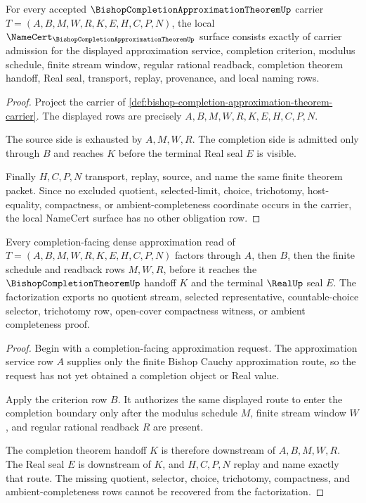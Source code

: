 \begin{theorem}
\label{thm:bishop-completion-approximation-carrier-certificate}
For every accepted $\BishopCompletionApproximationTheoremUp$ carrier $T=(A,B,M,W,R,K,E,H,C,P,N)$, the local $\NameCert_{\BishopCompletionApproximationTheoremUp}$ surface consists exactly of carrier admission for the displayed approximation service, completion criterion, modulus schedule, finite stream window, regular rational readback, completion theorem handoff, Real seal, transport, replay, provenance, and local naming rows.
\end{theorem}
\begin{proof}
Project the carrier of \autoref{def:bishop-completion-approximation-theorem-carrier}. The displayed rows are precisely $A,B,M,W,R,K,E,H,C,P,N$.

The source side is exhausted by $A,M,W,R$. The completion side is admitted only through $B$ and reaches $K$ before the terminal Real seal $E$ is visible.

Finally $H,C,P,N$ transport, replay, source, and name the same finite theorem packet. Since no excluded quotient, selected-limit, choice, trichotomy, host-equality, compactness, or ambient-completeness coordinate occurs in the carrier, the local NameCert surface has no other obligation row.
\end{proof}

\begin{theorem}
\label{thm:bishop-completion-approximation-density-factorization}
Every completion-facing dense approximation read of $T=(A,B,M,W,R,K,E,H,C,P,N)$ factors through $A$, then $B$, then the finite schedule and readback rows $M,W,R$, before it reaches the $\BishopCompletionTheoremUp$ handoff $K$ and the terminal $\RealUp$ seal $E$. The factorization exports no quotient stream, selected representative, countable-choice selector, trichotomy row, open-cover compactness witness, or ambient completeness proof.
\end{theorem}
\begin{proof}
Begin with a completion-facing approximation request. The approximation service row $A$ supplies only the finite Bishop Cauchy approximation route, so the request has not yet obtained a completion object or Real value.

Apply the criterion row $B$. It authorizes the same displayed route to enter the completion boundary only after the modulus schedule $M$, finite stream window $W$, and regular rational readback $R$ are present.

The completion theorem handoff $K$ is therefore downstream of $A,B,M,W,R$. The Real seal $E$ is downstream of $K$, and $H,C,P,N$ replay and name exactly that route. The missing quotient, selector, choice, trichotomy, compactness, and ambient-completeness rows cannot be recovered from the factorization.
\end{proof}

